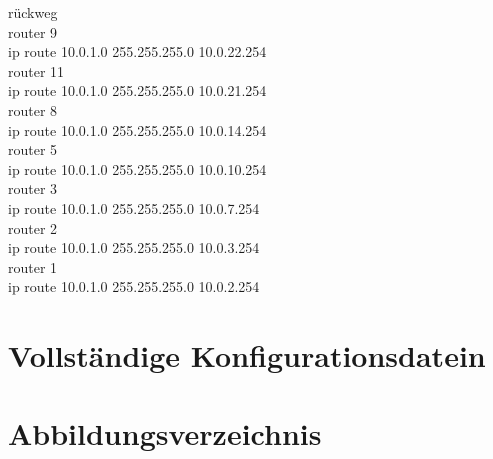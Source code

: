 \documentclass[a4paper]{article}
\begin{document}
rückweg\\
router 9\\
ip route 10.0.1.0 255.255.255.0 10.0.22.254 \\
router 11\\
ip route 10.0.1.0 255.255.255.0 10.0.21.254 \\
router 8\\
ip route 10.0.1.0 255.255.255.0 10.0.14.254 \\
router 5\\
ip route 10.0.1.0 255.255.255.0 10.0.10.254 \\
router 3\\
ip route 10.0.1.0 255.255.255.0 10.0.7.254 \\
router 2\\
ip route 10.0.1.0 255.255.255.0 10.0.3.254 \\
router 1\\
ip route 10.0.1.0 255.255.255.0 10.0.2.254 \\



\newpage

\section{Vollständige Konfigurationsdatein}

\newpage

\section{Abbildungsverzeichnis}

\listoffigures
\end{document}
